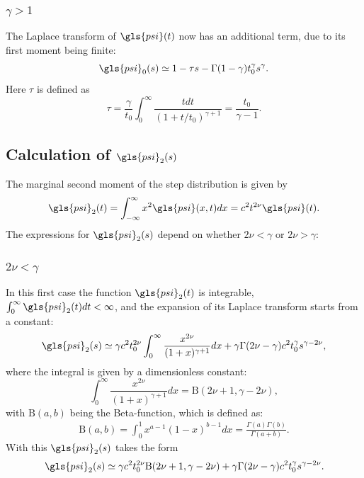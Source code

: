 \subsubsection*{$ \gamma>1$}
The Laplace transform of $\gls{psi}(t)$ now has an additional term, due to its first moment being finite:
\begin{equation}
\gls{psi}_{0}(s) \simeq 1 - \tau s - \Gamma(1-\gamma ) t_0^\gamma s^\gamma.
\label{eqn:psi0GammaBig}
\end{equation}  
Here $\tau$ is defined as 
\begin{equation}
 \tau = \frac{\gamma}{t_0} \int_0^\infty \frac{t dt}{(1+t/t_0)^{\gamma +1}} = 
 \frac{t_0}{\gamma-1} . \label{eq:tau}
\end{equation}

\subsection*{Calculation of $\gls{psi}_2(s)$}
The marginal second moment of the step distribution is given by  
\begin{align}
 \gls{psi}_2(t) = \int_{-\infty}^\infty x^2 \gls{psi}(x,t) dx = c^2 t^{2 \nu} \gls{psi}(t).
\end{align}
The expressions for $\gls{psi}_2(s)$ depend on whether $2 \nu < \gamma $ or $2 \nu > \gamma$:

\subsubsection*{$2\nu<\gamma$} 
In this first case the function $\gls{psi}_2(t)$ is integrable, $\int_0^\infty \gls{psi}_2(t) dt < \infty$, and the expansion 
of its Laplace transform starts from a constant:
\begin{equation}
 \gls{psi}_2(s) \simeq \gamma c^2 t_0^{2\nu}  \int_0^\infty \frac{x^{2\nu}}{(1+x)^{\gamma+1}} dx  + \gamma \Gamma(2\nu-\gamma) c^2t_0^\gamma s^{\gamma-2\nu} ,
\end{equation}
where the integral is given by a dimensionless constant:
\begin{equation}
 \int_0^\infty \frac{x^{2\nu}}{(1+x)^{\gamma+1}} dx = \mathrm{B}(2\nu+1,\gamma-2\nu), \label{eqn:I1}
\end{equation}
with $\mathrm{B}(a,b)$ being the Beta-function, which is defined as:
%
\begin{align}
\mathrm{B}(a,b) = \int_{0}^{1} x^{a-1}(1-x)^{b-1} dx = \frac{\Gamma(a)\Gamma(b)}{\Gamma(a+b)} .
\end{align}
%
With this $\gls{psi}_2(s)$ takes the form 
%
\begin{align}
\gls{psi}_2(s) \simeq \gamma c^2 t_0^{2\nu}  \mathrm{B}(2\nu+1,\gamma-2\nu)  + \gamma \Gamma(2\nu-\gamma) c^2t_0^\gamma s^{\gamma-2\nu} \label{eqn:psi2NuSmall} .
\end{align}


